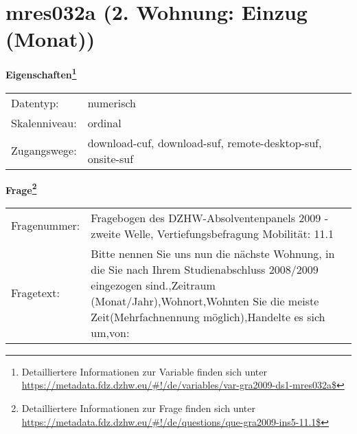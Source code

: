 
    \setcounter{footnote}{0}

    \vspace*{-1.8cm}
	\section{mres032a (2. Wohnung: Einzug (Monat))}
	\label{section:mres032a}



    \vspace*{0.5cm}
    \noindent\textbf{Eigenschaften\footnote{Detailliertere Informationen zur Variable finden sich unter
		\url{https://metadata.fdz.dzhw.eu/\#!/de/variables/var-gra2009-ds1-mres032a$}}}\\
	\begin{tabularx}{\hsize}{@{}lX}
	Datentyp: & numerisch \\
	Skalenniveau: & ordinal \\
	Zugangswege: &
	  download-cuf, 
	  download-suf, 
	  remote-desktop-suf, 
	  onsite-suf
 \\
    \end{tabularx}



				\vspace*{0.5cm}
                \noindent\textbf{Frage\footnote{Detailliertere Informationen zur Frage finden sich unter
		              \url{https://metadata.fdz.dzhw.eu/\#!/de/questions/que-gra2009-ins5-11.1$}}}\\
				\begin{tabularx}{\hsize}{@{}lX}
					Fragenummer: &
					  Fragebogen des DZHW-Absolventenpanels 2009 - zweite Welle, Vertiefungsbefragung Mobilität:
					  11.1
 \\
					Fragetext: & Bitte nennen Sie uns nun die nächste Wohnung, in die Sie nach Ihrem Studienabschluss 2008/2009 eingezogen sind.,Zeitraum (Monat/Jahr),Wohnort,Wohnten Sie die meiste Zeit(Mehrfachnennung möglich),Handelte es sich um,von: \\
				\end{tabularx}





